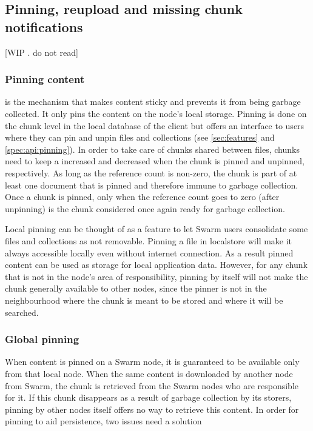 \subsection{Pinning, reupload and missing chunk notifications}\label{sec:reupload}

[WIP . do not read]

\subsubsection{Pinning content}\label{sec:pinning}

 is the mechanism that makes content sticky and prevents it from being garbage collected. It only pins the content on the node's local storage. Pinning is done on the chunk level in the local database of the client but offers an interface to users where they can pin and unpin files and collections (see \ref{sec:features} and \ref{spec:api:pinning}). In order to take care of chunks shared between files, chunks need to keep a  increased and decreased when the chunk is pinned and unpinned, respectively. As long as the reference count is non-zero, the chunk is part of at  least one document that is pinned and therefore immune to garbage collection. Once a chunk is pinned, only when the reference count goes to zero (after unpinning) is the chunk considered once again ready for garbage collection.

Local pinning can be thought of as a feature to let Swarm users consolidate some files and collections as not removable. Pinning a file in localstore will make it always accessible locally even without internet connection. As a result pinned content can be used as storage for local application data. However, for any chunk that is not in the node's area of responsibility, pinning by itself will not make the chunk generally available to other nodes, since the pinner is not in the neighbourhood where the chunk is meant to be stored and where it will be searched.


\subsubsection{Global pinning}

When content is pinned on a Swarm node, it is guaranteed to be available only from that local node. When the same content is downloaded by another  node from Swarm, the chunk is retrieved from the Swarm nodes who are responsible for it. If this chunk disappears as a result of garbage collection by its storers, pinning by other nodes itself offers no way to retrieve this content. In order for pinning to aid persistence, two issues need a solution

